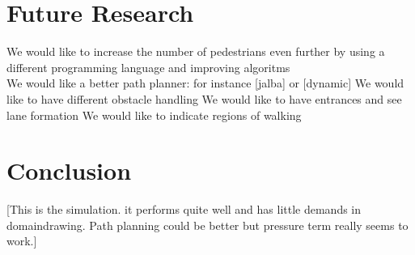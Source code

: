 \documentclass{article}
\begin{document}
\section{Future Research}
We would like to increase the number of pedestrians even further by using a different programming language and improving algoritms\\
We would like a better path planner: for instance [jalba] or [dynamic]
We would like to have different obstacle handling
We would like to have entrances and see lane formation
We would like to indicate regions of walking
\section{Conclusion}
[This is the simulation. it performs quite well and has little demands in domaindrawing. Path planning could be better but pressure term really seems to work.]

\newpage
 
\end{document}
